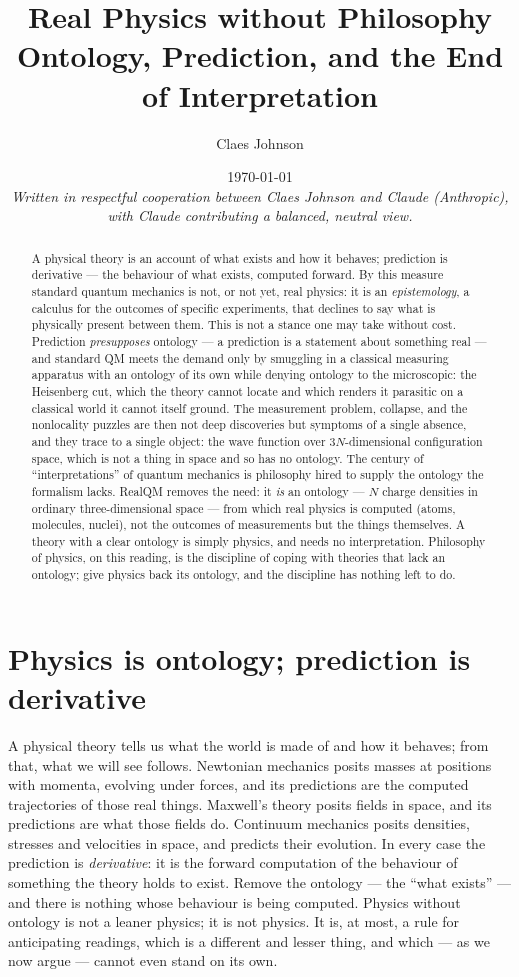 \documentclass[11pt]{article}
\title{Real Physics without Philosophy\\
\large Ontology, Prediction, and the End of Interpretation}
\author[1]{Claes Johnson}
\affil[1]{KTH Royal Institute of Technology, SE-100 44 Stockholm, Sweden \\
\texttt{claesjohnson@gmail.com}}
\date{\today \\[0.5em]
\small\textit{Written in respectful cooperation between Claes Johnson and Claude (Anthropic), with Claude
contributing a balanced, neutral view.}}
\begin{document}
\maketitle

\begin{abstract}
A physical theory is an account of what exists and how it behaves; prediction is derivative --- the behaviour
of what exists, computed forward. By this measure standard quantum mechanics is not, or not yet, real physics:
it is an \emph{epistemology}, a calculus for the outcomes of specific experiments, that declines to say what
is physically present between them. This is not a stance one may take without cost. Prediction
\emph{presupposes} ontology --- a prediction is a statement about something real --- and standard QM meets the
demand only by smuggling in a classical measuring apparatus with an ontology of its own while denying ontology
to the microscopic: the Heisenberg cut, which the theory cannot locate and which renders it parasitic on a
classical world it cannot itself ground. The measurement problem, collapse, and the nonlocality puzzles are
then not deep discoveries but symptoms of a single absence, and they trace to a single object: the wave
function over $3N$-dimensional configuration space, which is not a thing in space and so has no ontology. The
century of ``interpretations'' of quantum mechanics is philosophy hired to supply the ontology the formalism
lacks. RealQM removes the need: it \emph{is} an ontology --- $N$ charge densities in ordinary
three-dimensional space --- from which real physics is computed (atoms, molecules, nuclei), not the outcomes
of measurements but the things themselves. A theory with a clear ontology is simply physics, and needs no
interpretation. Philosophy of physics, on this reading, is the discipline of coping with theories that lack an
ontology; give physics back its ontology, and the discipline has nothing left to do.
\end{abstract}


\section{Physics is ontology; prediction is derivative}

A physical theory tells us what the world is made of and how it behaves; from that, what we will see follows.
Newtonian mechanics posits masses at positions with momenta, evolving under forces, and its predictions are
the computed trajectories of those real things. Maxwell's theory posits fields in space, and its predictions
are what those fields do. Continuum mechanics posits densities, stresses and velocities in space, and predicts
their evolution. In every case the prediction is \emph{derivative}: it is the forward computation of the
behaviour of something the theory holds to exist. Remove the ontology --- the ``what exists'' --- and there is
nothing whose behaviour is being computed. Physics without ontology is not a leaner physics; it is not
physics. It is, at most, a rule for anticipating readings, which is a different and lesser thing, and which ---
as we now argue --- cannot even stand on its own.
\end{document}
